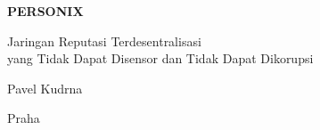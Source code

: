 \thispagestyle{empty}
\begin{center}
  {\sffamily\bfseries\fontsize{34}{40}\selectfont PERSONIX\par}
  \vspace{2.2em}
  {\rmfamily\large Jaringan Reputasi Terdesentralisasi\\[0.25em]
   yang Tidak Dapat Disensor dan Tidak Dapat Dikorupsi\par}
\end{center}
\begin{center}
  {\rmfamily\Large Pavel Kudrna\par}
  \vspace{0.45em}
  {\rmfamily\small Praha\quad\textbullet{}\par}
\end{center}
\clearpage
